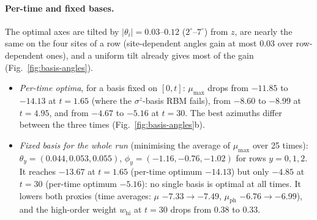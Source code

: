 \documentclass[11pt,a4paper]{article}
\begin{document}
\paragraph{Per-time and fixed bases.} The optimal axes are tilted by $|\theta_i|=0.03$--$0.12$ ($2^\circ$--$7^\circ$)
from $z$, are nearly the same on the four sites of a row (site-dependent angles gain at most $0.03$ over
row-dependent ones), and a uniform tilt already gives most of the gain (Fig.~\ref{fig:basis-angles}).
\begin{itemize}
  \item \emph{Per-time optima}, for a basis fixed on $[0,t]$: $\mu_{\max}$ drops from $-11.85$ to $-14.13$ at
    $t=1.65$ (where the $\sigma^z$-basis RBM fails), from $-8.60$ to $-8.99$ at $t=4.95$, and from $-4.67$ to $-5.16$ at
    $t=30$. The best azimuths differ between the three times (Fig.~\ref{fig:basis-angles}b).
  \item \emph{Fixed basis for the whole run} (minimising the average of $\mu_{\max}$ over 25 times): $\theta_y=(0.044,
    0.053, 0.055)$, $\phi_y=(-1.16, -0.76, -1.02)$ for rows $y=0,1,2$. It reaches $-13.67$ at $t=1.65$ (per-time
    optimum $-14.13$) but only $-4.85$ at $t=30$ (per-time optimum $-5.16$): no single basis is optimal at all times. It
    lowers both proxies (time averages: $\mu$ $-7.33\to-7.49$, $\mu_{\mathrm{ph}}$ $-6.76\to-6.99$), and the high-order
    weight $w_{\mathrm{hi}}$ at $t=30$ drops from $0.38$ to $0.33$.
\end{itemize}
\end{document}

